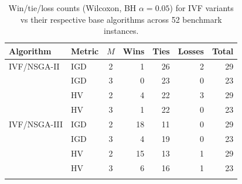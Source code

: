 \begin{table}[t]
\centering
\caption{Win/tie/loss counts (Wilcoxon, BH $\alpha=0.05$) for IVF variants vs their respective base algorithms across 52 benchmark instances.}
\label{tab:nsga_summary}
\begin{tabular}{llcrrrr}
\toprule
Algorithm & Metric & $M$ & Wins & Ties & Losses & Total \\
\midrule
IVF/NSGA-II & IGD & 2 & 1 & 26 & 2 & 29 \\
 & IGD & 3 & 0 & 23 & 0 & 23 \\
 & HV & 2 & 4 & 22 & 3 & 29 \\
 & HV & 3 & 1 & 22 & 0 & 23 \\
\addlinespace
IVF/NSGA-III & IGD & 2 & 18 & 11 & 0 & 29 \\
 & IGD & 3 & 4 & 19 & 0 & 23 \\
 & HV & 2 & 15 & 13 & 1 & 29 \\
 & HV & 3 & 6 & 16 & 1 & 23 \\
\addlinespace
\bottomrule
\end{tabular}
\end{table}

